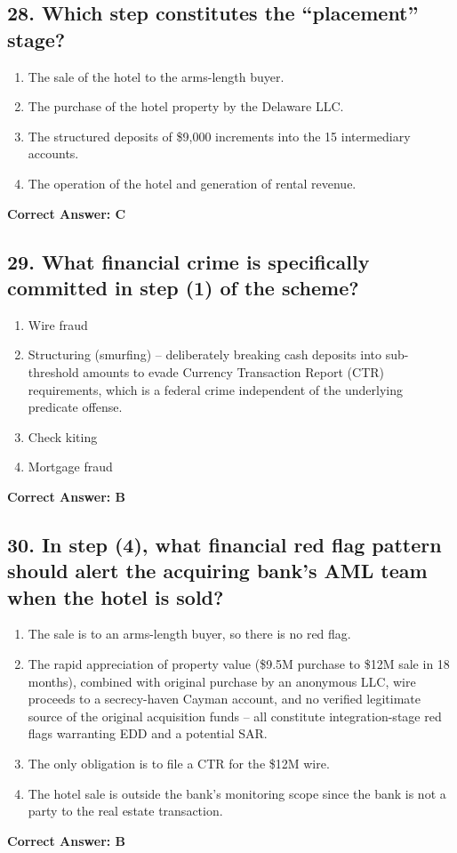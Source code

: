 \documentclass[11pt,a4paper]{article}
\begin{document}
	\subsection{28. Which step constitutes the ``placement'' stage?}
	\begin{enumerate}[label=\Alph*.]
		\item The sale of the hotel to the arms-length buyer.
		\item The purchase of the hotel property by the Delaware LLC.
		\item The structured deposits of \$9,000 increments into the 15 intermediary accounts.
		\item The operation of the hotel and generation of rental revenue.
	\end{enumerate}
	\textbf{Correct Answer: C}
	
	\subsection{29. What financial crime is specifically committed in step (1) of the scheme?}
	\begin{enumerate}[label=\Alph*.]
		\item Wire fraud
		\item Structuring (smurfing) -- deliberately breaking cash deposits into sub-threshold amounts to evade Currency Transaction Report (CTR) requirements, which is a federal crime independent of the underlying predicate offense.
		\item Check kiting
		\item Mortgage fraud
	\end{enumerate}
	\textbf{Correct Answer: B}
	
	\subsection{30. In step (4), what financial red flag pattern should alert the acquiring bank's AML team when the hotel is sold?}
	\begin{enumerate}[label=\Alph*.]
		\item The sale is to an arms-length buyer, so there is no red flag.
		\item The rapid appreciation of property value (\$9.5M purchase to \$12M sale in 18 months), combined with original purchase by an anonymous LLC, wire proceeds to a secrecy-haven Cayman account, and no verified legitimate source of the original acquisition funds -- all constitute integration-stage red flags warranting EDD and a potential SAR.
		\item The only obligation is to file a CTR for the \$12M wire.
		\item The hotel sale is outside the bank's monitoring scope since the bank is not a party to the real estate transaction.
	\end{enumerate}
	\textbf{Correct Answer: B}
	
\end{document}
